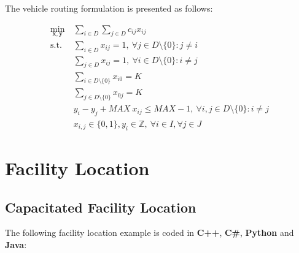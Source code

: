 \documentclass[10pt,bezier]{article}
\begin{document}
\noindent The vehicle routing formulation is presented as follows:

\begin{subequations}
    \begin{align}
    \min_{\pmb{x},\pmb{y}}~& \sum_{i \in D} \sum_{j \in D} c_{ij} x_{ij}  \tag{Minimize total cost}\\
    \text{s.t. } & \sum_{i \in D} x_{ij} = 1,~ \forall j \in D \setminus \{0\}: j \neq i \tag{1.1a - Only one vehicle can enter a destination}\\
                 & \sum_{j \in D} x_{ij} = 1,~ \forall i \in D \setminus \{0\}: i \neq j \tag{1.1b - Only one vehicle can leave a destination}\\
                 & \sum_{i \in D \setminus \{0\}} x_{i0} = K \tag{1.1c - Number of vehicles leaving the depot at destination 0}\\
                 & \sum_{j \in D \setminus \{0\}} x_{0j} = K \tag{1.1d - Number of vehicles entering the depot at destination 0}\\
                 & y_i - y_j + MAX~x_{ij} \leq MAX -1,~\forall i, j \in D \setminus \{0\} : i \neq j \tag{1.1e - Subtour elimination (Miller-Tucker-Zemlin)}\\
                 & x_{i,j} \in \{0,1\}, y_i \in \mathbb{Z},~\forall i \in I, \forall j \in J  \tag{1.1f - Domain}
    \end{align}
\end{subequations}

\newpage
\section{Facility Location}\label{section2}

\subsection{Capacitated Facility Location}\label{section2.1}
The following facility location example is coded in {\color{blue}\textbf{C++}}, {\color{blue}\textbf{C\#}}, {\color{blue}\textbf{Python}} and {\color{blue}\textbf{Java}}:\\
\end{document}
